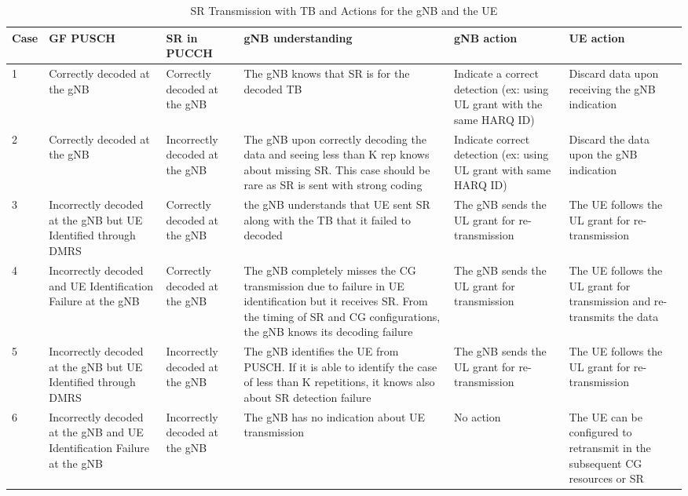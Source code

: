 \documentclass[conference]{IEEEtran}
\begin{document}
\begin{table}[htbp]
\caption{SR Transmission with TB and Actions for the gNB and the UE}
\begin{center}
\begin{tabular}{|p{1.5em}|p{9em}|p{9em}|p{12em}|p{9em}|p{9em}|}
 \hline
 \textbf{Case} & \textbf{GF PUSCH} & \textbf{SR in PUCCH} & \textbf{gNB understanding} & \textbf{gNB action} & \textbf{UE action}\\ 
 \hline
 1 & Correctly decoded at the gNB & Correctly decoded at the gNB & The gNB knows that SR is for the decoded TB & Indicate a correct detection (ex: using UL grant with the same HARQ ID) & Discard data upon receiving the gNB indication\\
 \hline
 2 &  Correctly decoded at the gNB & Incorrectly decoded at the gNB & The gNB upon correctly decoding the data and seeing less than K rep knows about missing SR. This case should be rare as SR is sent with strong coding & Indicate correct detection (ex: using UL grant with same HARQ ID) & Discard the data upon the gNB indication\\
\hline
3 & Incorrectly decoded at the gNB but UE Identified through DMRS & Correctly decoded at the gNB & the gNB understands that UE sent SR along with the TB that it failed to decoded & The gNB sends the UL grant for re-transmission & The UE follows the UL grant for re-transmission\\
\hline
4 & Incorrectly decoded and UE Identification Failure at the gNB & Correctly decoded at the gNB & The gNB completely misses the CG transmission due to failure in UE identification but it receives SR. From the timing of SR and CG configurations, the gNB knows its decoding failure & The gNB sends the UL grant for transmission & The UE follows the UL grant for transmission and re-transmits the data\\
\hline
5 & Incorrectly decoded at the gNB but UE Identified through DMRS & Incorrectly decoded at the gNB & The gNB identifies the UE from PUSCH. If it is able to identify the case of less than K repetitions, it knows also about SR detection failure & The gNB sends the UL grant for re-transmission & The UE follows the UL grant for re-transmission\\
\hline
 6 & Incorrectly decoded at the gNB and UE Identification Failure at the gNB & Incorrectly decoded at the gNB & The gNB has no indication about UE transmission & No action & The UE can be configured to
retransmit in the subsequent CG resources or SR\\
 

 
 \hline
\end{tabular}
\label{tab1}
\end{center}
\vspace{-7mm}
\end{table}
\end{document}
